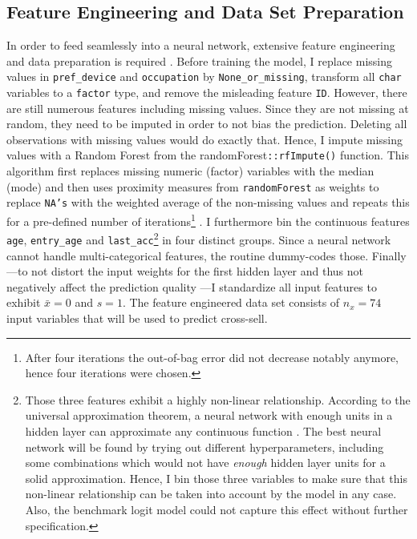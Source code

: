 \documentclass[12pt,a4paper]{article}
\newcommand{\pkg}[1]{{\normalfont\fontseries{b}\selectfont #1}}
\let\code=\texttt
\begin{document}
\subsection{Feature Engineering and Data Set Preparation}
In order to feed seamlessly into a neural network, extensive feature engineering and data preparation is required \citep{hastieElementsStatisticalLearning2017}.
Before training the model, I replace missing values in \code{pref\_device} and \code{occupation} by \code{None\_or\_missing}, transform all \code{char} variables to a \code{factor} type, and remove the misleading feature \code{ID}.
However, there are still numerous features including missing values. Since they are not missing at random, they need to be imputed in order to not
bias the prediction.
Deleting all observations with missing values would do exactly that.
Hence, I impute missing values with a Random Forest from the \pkg{randomForest}\code{::rfImpute()} function.
This algorithm first replaces missing numeric (factor) variables with the median (mode) and then uses proximity measures from \code{randomForest}
as weights to replace \code{NA's} with the weighted average of the non-missing values and repeats this for a
pre-defined number of iterations\footnote{After four iterations the out-of-bag error did not decrease notably anymore, hence four iterations were chosen.}
 \citep{liawClassificationRegressionRandomForest2002}.
I furthermore bin the continuous features \code{age}, \code{entry\_age} and \code{last\_acc}\footnote{Those three features exhibit a highly
non-linear relationship. According to the universal approximation theorem, a 
neural network with enough units in a hidden layer can approximate any continuous function \citep{hornikApproximationCapabilitiesMultilayer1991}.
The best neural network will be found by trying out different hyperparameters, including some combinations which would not have \textit{enough}
hidden layer units for a solid approximation. Hence, I bin
those three variables to make sure that this non-linear relationship can be taken into account by the model in any case. Also, the benchmark logit model
could not capture this effect without further specification.}
in four distinct groups.
Since a neural network cannot handle multi-categorical features, the routine dummy-codes those.
Finally---to not distort the input weights for the first hidden layer and thus not negatively affect the prediction quality 
\citep[pp. 398]{hastieElementsStatisticalLearning2017}---I standardize all input features to exhibit $\bar{x}=0$ and $s=1$.
The feature engineered data set consists of $n_x = 74$ input variables that will be used to predict cross-sell. 
\end{document}

